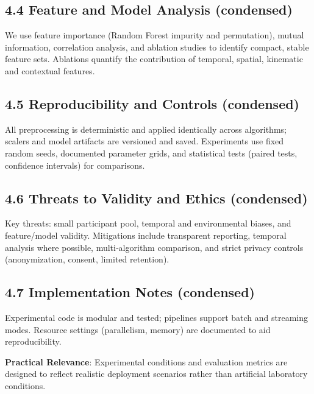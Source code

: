 \documentclass[
  11pt,
  a4paper,
]{article}
\begin{document}
\subsection{4.4 Feature and Model Analysis
(condensed)}\label{feature-and-model-analysis-condensed}

We use feature importance (Random Forest impurity and permutation),
mutual information, correlation analysis, and ablation studies to
identify compact, stable feature sets. Ablations quantify the
contribution of temporal, spatial, kinematic and contextual features.

\subsection{4.5 Reproducibility and Controls
(condensed)}\label{reproducibility-and-controls-condensed}

All preprocessing is deterministic and applied identically across
algorithms; scalers and model artifacts are versioned and saved.
Experiments use fixed random seeds, documented parameter grids, and
statistical tests (paired tests, confidence intervals) for comparisons.

\subsection{4.6 Threats to Validity and Ethics
(condensed)}\label{threats-to-validity-and-ethics-condensed}

Key threats: small participant pool, temporal and environmental biases,
and feature/model validity. Mitigations include transparent reporting,
temporal analysis where possible, multi‑algorithm comparison, and strict
privacy controls (anonymization, consent, limited retention).

\subsection{4.7 Implementation Notes
(condensed)}\label{implementation-notes-condensed-1}

Experimental code is modular and tested; pipelines support batch and
streaming modes. Resource settings (parallelism, memory) are documented
to aid reproducibility.

\newpage

\textbf{Practical Relevance}: Experimental conditions and evaluation
metrics are designed to reflect realistic deployment scenarios rather
than artificial laboratory conditions.
\end{document}
